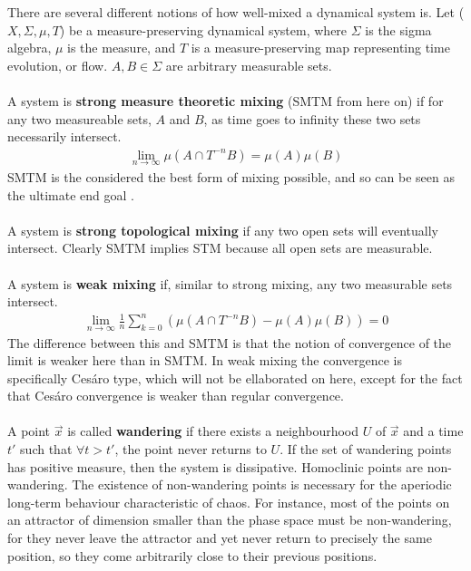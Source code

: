 \documentclass[a4paper,12pt]{article}
\begin{document}
There are several different notions of how well-mixed a dynamical system is. Let ($X,\Sigma,\mu,T$) be a measure-preserving dynamical system, where $\Sigma$ is the sigma algebra, $\mu$ is the measure, and $T$ is a measure-preserving map representing time evolution, or flow. $A, B \in \Sigma$ are arbitrary measurable sets.
\\ \\
A system is \textbf{strong measure theoretic mixing} (SMTM from here on) if for any two measureable sets, $A$ and $B$, as time goes to infinity these two sets necessarily intersect. 
\begin{align*}
\lim_{n \to \infty} \mu(A \cap T^{-n}B) = \mu(A)\mu(B)
\end{align*} SMTM is the considered the best form of mixing possible, and so can be seen as the ultimate end goal \citep[~p.119]{o81}.
\\ \\
A system is \textbf{strong topological mixing} if any two open sets will eventually intersect. Clearly SMTM implies STM because all open sets are measurable.
\\ \\
A system is \textbf{weak mixing} if, similar to strong mixing, any two measurable sets intersect. 
\begin{align*}
\lim_{n \to \infty} \frac{1}{n} \sum^n_{k=0} \left(\mu(A \cap T^{-n}B) - \mu(A)\mu(B)\right) = 0
\end{align*} The difference between this and SMTM is that the notion of convergence of the limit is weaker here than in SMTM. In weak mixing the convergence is specifically Ces{\'a}ro type, which will not be ellaborated on here, except for the fact that Ces{\'a}ro convergence is weaker than regular convergence.
\\ \\
A point $\vec{x}$ is called \textbf{wandering} if there exists a neighbourhood $U$ of $\vec{x}$ and a time $t'$ such that $\forall t>t'$, the point never returns to $U$. If the set of wandering points has positive measure, then the system is dissipative. Homoclinic points are non-wandering. The existence of non-wandering points is necessary for the aperiodic long-term behaviour characteristic of chaos. For instance, most of the points on an attractor of dimension smaller than the phase space must be non-wandering, for they never leave the attractor and yet never return to precisely the same position, so they come arbitrarily close to their previous positions.
\\ \\
\end{document}

